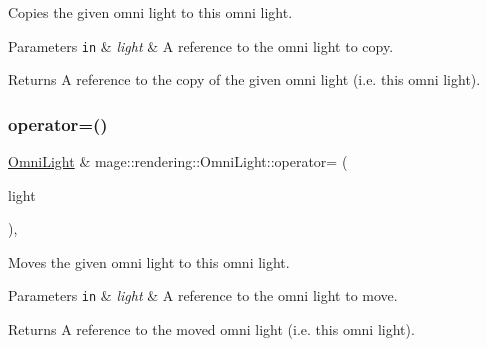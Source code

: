 Copies the given omni light to this omni light.


\begin{DoxyParams}[1]{Parameters}
\mbox{\tt in}  & {\em light} & A reference to the omni light to copy. \\
\hline
\end{DoxyParams}
\begin{DoxyReturn}{Returns}
A reference to the copy of the given omni light (i.\+e. this omni light). 
\end{DoxyReturn}
\hypertarget{classmage_1_1rendering_1_1_omni_light_a8126d5d0d3a45d0063c3fd2f28e3826e}{}\label{classmage_1_1rendering_1_1_omni_light_a8126d5d0d3a45d0063c3fd2f28e3826e} 
\subsubsection{\texorpdfstring{operator=()}{operator=()}\hspace{0.1cm}{\footnotesize\ttfamily [2/2]}}
{\footnotesize\ttfamily \hyperlink{classmage_1_1rendering_1_1_omni_light}{Omni\+Light} \& mage\+::rendering\+::\+Omni\+Light\+::operator= (\begin{DoxyParamCaption}\item[{\hyperlink{classmage_1_1rendering_1_1_omni_light}{Omni\+Light} \&\&}]{light }\end{DoxyParamCaption})\hspace{0.3cm}{\ttfamily [default]}, {\ttfamily [noexcept]}}

Moves the given omni light to this omni light.


\begin{DoxyParams}[1]{Parameters}
\mbox{\tt in}  & {\em light} & A reference to the omni light to move. \\
\hline
\end{DoxyParams}
\begin{DoxyReturn}{Returns}
A reference to the moved omni light (i.\+e. this omni light). 
\end{DoxyReturn}
\hypertarget{classmage_1_1rendering_1_1_omni_light_af1334671baf6f5afeb297fb819118639}{}\label{classmage_1_1rendering_1_1_omni_light_af1334671baf6f5afeb297fb819118639} 
